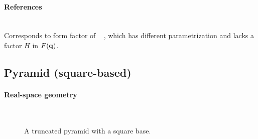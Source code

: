 \paragraph{References}\strut\\
Corresponds to  form factor of \IsGISAXS\
\cite[Eq.~2.31]{Laz08} \cite[Eq.~221]{ReLL09},
which has different parametrization
and lacks a factor $H$ in $F(\mathbf{q})$.

\clearpage
\subsection{Pyramid (square-based)}\label{sec:Pyramid}

\paragraph{Real-space geometry}\strut\\

\begin{figure}[H]
\hfill
{}
\hfill
{}
\hfill
{}
\hfill
\caption{A truncated pyramid with a square base.}
\end{figure}

